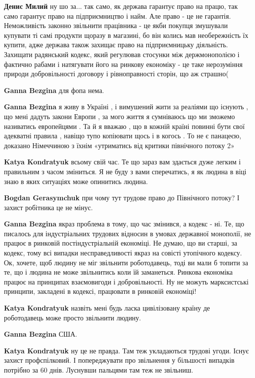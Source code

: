 \begin{itemize}
\begin{itemize}
\textbf{Денис Милий} ну шо за... так само, як держава гарантує право на працю, так само гарантує право на підприємництво і найм. Але право - це не гарантія. Неможливість законно звільнити працівника - це якби покупця змушували купувати ті самі продукти щоразу в магазині, бо він колись мав необережність їх купити, адже держава також захищає право на підприємницьку діяльність. Захищати радянський кодекс, який регулював стосунки між держмонополією і фактично рабами і натягувати його на ринкову економіку - це таке нерозуміння природи добровільності договору і рівноправності сторін, що аж страшно(

\textbf{Ganna Bezgina} для фопа нема.

\textbf{Ganna Bezgina} я живу в Україні , і вимушений жити за реаліями що існують , що мені дадуть закони Европи , за мого життя я сумніваюсь що ми зможемо називатись европейцями . Та й я вважаю , що в кожній країні повинні бути свої адекватні правила , навіщо тупо копіювати щось і в когось . То не є панацеєю, доказано Німеччиною з їхнім «утриматись від критики північного потоку 2»

\textbf{Katya Kondratyuk} всьому свій час. Те що зараз вам здається дуже легким і правильним з часом зміниться. Я не буду з вами сперечатись, я як людина в віці знаю в яких ситуаціях може опинитись людина.

\textbf{Bogdan Gerasymchuk} при чому тут трудове право до Північного потоку? І захист робітника це не мінус.

\textbf{Ganna Bezgina} якраз проблема в тому, що час змінився, а кодекс - ні. Те, що писалось для індустріальних трудових відносин в умовах державної монополії, не працює в ринковій постіндустріальній економіці. Не думаю, що ви старші, за кодекс, тому всі випадки несправедливості якраз на совісті утопічного кодексу.
Ок, хочете, щоб людину не міг звільнити роботодавець, тоді ви мали б топити за те, що і людина не може звільнитись коли їй заманеться. Ринкова економіка працює на принципах взаємовигоди і добровільності. Ну не можуть марксистські принципи, закладені в кодексі, працювати в ринковій економіці!

\textbf{Katya Kondratyuk} назвіть мені будь ласка цивілізовану країну де роботодавець може просто звільнити людину.

\textbf{Ganna Bezgina} США.

\textbf{Katya Kondratyuk} ну це не правда. Там теж укладаються трудові угоди. Існує захист профспілковий. І попереджувати про звільнення у більшості випадків потрібно за 60 днів. Луснувши пальцями там теж не звільниш.


\end{itemize}
\end{itemize}
